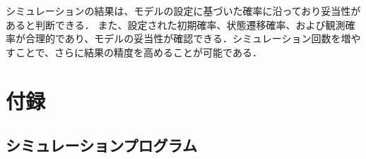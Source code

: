 \documentclass[dvipdfmx,titlepage,a4j]{jsarticle}
\begin{document}
シミュレーションの結果は、モデルの設定に基づいた確率に沿っており妥当性があると判断できる．
また、設定された初期確率、状態遷移確率、および観測確率が合理的であり、モデルの妥当性が確認できる．シミュレーション回数を増やすことで、さらに結果の精度を高めることが可能である．

\section{付録}
\subsection{シミュレーションプログラム}



\nocite{*}


\end{document}
